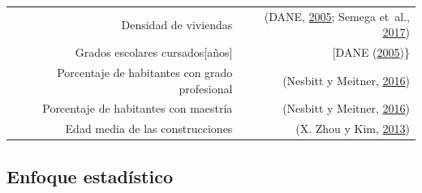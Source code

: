 \documentclass[12pt,a4paper,openany]{book}
\theoremstyle{definition}
\theoremstyle{definition}
\theoremstyle{definition}
\theoremstyle{remark}
\begin{document}
\begin{longtable}[]{@{}rr@{}}
\begin{minipage}[t]{0.57\columnwidth}\raggedleft\strut
Densidad de viviendas\strut
\end{minipage} & \begin{minipage}[t]{0.31\columnwidth}\raggedleft\strut
(DANE, \protect\hyperlink{ref-censo_sistema_dane}{2005}; Semega et~al.,
\protect\hyperlink{ref-semega2017income}{2017})\strut
\end{minipage}\tabularnewline
\begin{minipage}[t]{0.57\columnwidth}\raggedleft\strut
Grados escolares cursados{[}años{]}\strut
\end{minipage} & \begin{minipage}[t]{0.31\columnwidth}\raggedleft\strut
{[}DANE (\protect\hyperlink{ref-censo_sistema_dane}{2005})\}\strut
\end{minipage}\tabularnewline
\begin{minipage}[t]{0.57\columnwidth}\raggedleft\strut
Porcentaje de habitantes con grado profesional\strut
\end{minipage} & \begin{minipage}[t]{0.31\columnwidth}\raggedleft\strut
(Nesbitt y Meitner,
\protect\hyperlink{ref-nesbitt_exploring_2016}{2016})\strut
\end{minipage}\tabularnewline
\begin{minipage}[t]{0.57\columnwidth}\raggedleft\strut
Porcentaje de habitantes con maestría\strut
\end{minipage} & \begin{minipage}[t]{0.31\columnwidth}\raggedleft\strut
(Nesbitt y Meitner,
\protect\hyperlink{ref-nesbitt_exploring_2016}{2016})\strut
\end{minipage}\tabularnewline
\begin{minipage}[t]{0.57\columnwidth}\raggedleft\strut
Edad media de las construcciones\strut
\end{minipage} & \begin{minipage}[t]{0.31\columnwidth}\raggedleft\strut
(X. Zhou y Kim, \protect\hyperlink{ref-zhou_social_2013}{2013})\strut
\end{minipage}\tabularnewline
\bottomrule
\end{longtable}

\subsection{Enfoque estadístico}\label{enfoque-estadistico}
\end{document}
